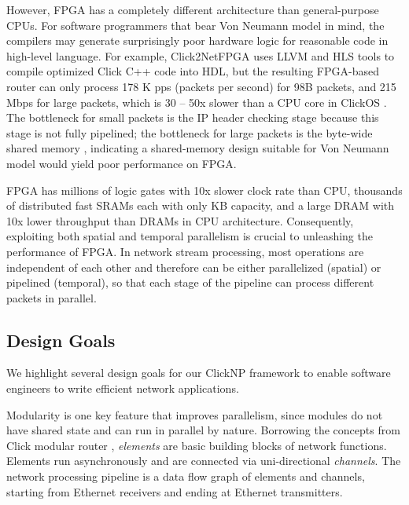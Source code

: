 {However, FPGA has a completely different architecture than general-purpose CPUs. For software programmers that bear Von Neumann model in mind, the compilers may generate surprisingly poor hardware logic for reasonable code in high-level language. For example, Click2NetFPGA \cite{Click2NetFPGA} uses LLVM and HLS tools to compile optimized Click C++ code into HDL, but the resulting FPGA-based router can only process 178 K pps (packets per second) for 98B packets, and 215 Mbps for large packets, which is 30 -- 50x slower than a CPU core in ClickOS \cite{martins2014clickos}. The bottleneck for small packets is the IP header checking stage \cite{Click2NetFPGA} because this stage is not fully pipelined; the bottleneck for large packets is the byte-wide shared memory \cite{Click2NetFPGA}, indicating a shared-memory design suitable for Von Neumann model would yield poor performance on FPGA.

FPGA has millions of logic gates with 10x slower clock rate than CPU, thousands of distributed fast SRAMs each with only KB capacity, and a large DRAM with 10x lower throughput than DRAMs in CPU architecture. Consequently, exploiting both spatial and temporal parallelism is crucial to unleashing the performance of FPGA. In network stream processing, most operations are independent of each other and therefore can be either parallelized (spatial) or pipelined (temporal), so that each stage of the pipeline can process different packets in parallel.

\subsection{Design Goals}
\label{subsec:designgoals}

We highlight several design goals for our ClickNP framework to enable software engineers to write efficient network applications.

 Modularity is one key feature that improves parallelism, since modules do not have shared state and can run in parallel by nature. Borrowing the concepts from Click modular router \cite{kohler2000click}, \textit{elements} are basic building blocks of network functions. Elements run asynchronously and are connected via uni-directional \textit{channels}. The network processing pipeline is a data flow graph of elements and channels, starting from Ethernet receivers and ending at Ethernet transmitters.

}
